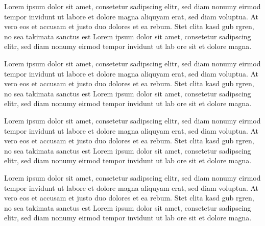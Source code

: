 \begin{ozet}
Lorem ipsum dolor sit amet, consetetur sadipscing elitr, sed diam nonumy eirmod tempor invidunt ut labore et dolore magna aliquyam erat, sed diam voluptua. At vero eos et accusam et justo duo dolores et ea rebum. Stet clita kasd gub rgren, no sea takimata sanctus est Lorem ipsum dolor sit amet, consetetur sadipscing elitr, sed diam nonumy eirmod tempor invidunt ut lab ore sit et dolore magna.

Lorem ipsum dolor sit amet, consetetur sadipscing elitr, sed diam nonumy eirmod tempor invidunt ut labore et dolore magna aliquyam erat, sed diam voluptua. At vero eos et accusam et justo duo dolores et ea rebum. Stet clita kasd gub rgren, no sea takimata sanctus est Lorem ipsum dolor sit amet, consetetur sadipscing elitr, sed diam nonumy eirmod tempor invidunt ut lab ore sit et dolore magna.

Lorem ipsum dolor sit amet, consetetur sadipscing elitr, sed diam nonumy eirmod tempor invidunt ut labore et dolore magna aliquyam erat, sed diam voluptua. At vero eos et accusam et justo duo dolores et ea rebum. Stet clita kasd gub rgren, no sea takimata sanctus est Lorem ipsum dolor sit amet, consetetur sadipscing elitr, sed diam nonumy eirmod tempor invidunt ut lab ore sit et dolore magna.

Lorem ipsum dolor sit amet, consetetur sadipscing elitr, sed diam nonumy eirmod tempor invidunt ut labore et dolore magna aliquyam erat, sed diam voluptua. At vero eos et accusam et justo duo dolores et ea rebum. Stet clita kasd gub rgren, no sea takimata sanctus est Lorem ipsum dolor sit amet, consetetur sadipscing elitr, sed diam nonumy eirmod tempor invidunt ut lab ore sit et dolore magna.
\end{ozet}

